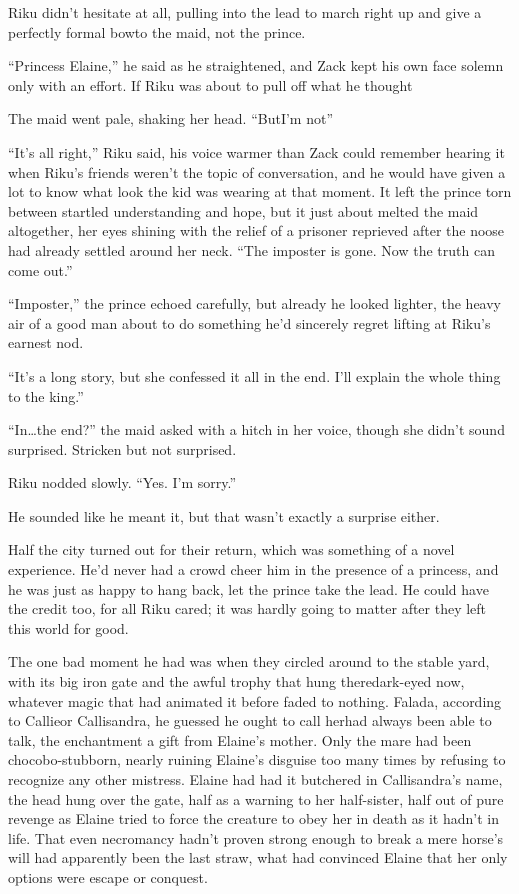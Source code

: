 Riku didn't hesitate at all, pulling into the lead to march right up and give a perfectly formal bow\textemdash to the maid, not the prince.
\begin{sloppypar}
``Princess Elaine,'' he said as he straightened, and Zack kept his own face solemn only with an effort. If Riku was about to pull off what he thought\textemdash 

The maid went pale, shaking her head. ``But\textemdash I'm not\textemdash ''
\end{sloppypar}
``It's all right,'' Riku said, his voice warmer than Zack could remember hearing it when Riku's friends weren't the topic of conversation, and he would have given a lot to know what look the kid was wearing at that moment. It left the prince torn between startled understanding and hope, but it just about melted the maid altogether, her eyes shining with the relief of a prisoner reprieved after the noose had already settled around her neck. ``The imposter is gone. Now the truth can come out.''

``Imposter,'' the prince echoed carefully, but already he looked lighter, the heavy air of a good man about to do something he'd sincerely regret lifting at Riku's earnest nod.

``It's a long story, but she confessed it all in the end. I'll explain the whole thing to the king.''

``In\ldots the end?'' the maid asked with a hitch in her voice, though she didn't sound surprised. Stricken but not surprised.

Riku nodded slowly. ``Yes. I'm sorry.''

He sounded like he meant it, but that wasn't exactly a surprise either.


\scenechange


Half the city turned out for their return, which was something of a novel experience. He'd never had a crowd cheer him in the presence of a princess, and he was just as happy to hang back, let the prince take the lead. He could have the credit too, for all Riku cared; it was hardly going to matter after they left this world for good.

The one bad moment he had was when they circled around to the stable yard, with its big iron gate and the awful trophy that hung there\textemdash dark-eyed now, whatever magic that had animated it before faded to nothing. Falada, according to Callie\textemdash or Callisandra, he guessed he ought to call her\textemdash had always been able to talk, the enchantment a gift from Elaine's mother. Only the mare had been chocobo-stubborn, nearly ruining Elaine's disguise too many times by refusing to recognize any other mistress. Elaine had had it butchered in Callisandra's name, the head hung over the gate, half as a warning to her half-sister, half out of pure revenge as Elaine tried to force the creature to obey her in death as it hadn't in life. That even necromancy hadn't proven strong enough to break a mere horse's will had apparently been the last straw, what had convinced Elaine that her only options were escape or conquest.

